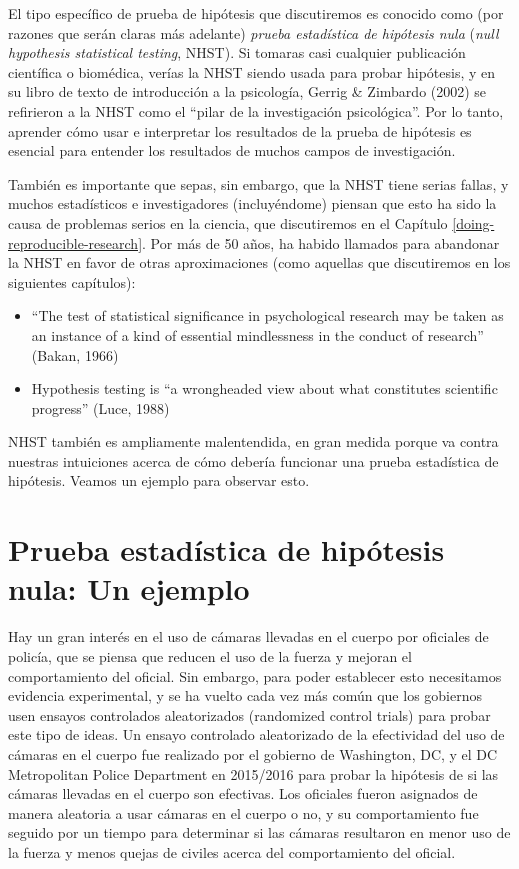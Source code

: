 \documentclass[
  12pt,
]{book}
\providecommand{\tightlist}{%
  \setlength{\itemsep}{0pt}\setlength{\parskip}{0pt}}
\begin{document}
El tipo específico de prueba de hipótesis que discutiremos es conocido como (por razones que serán claras más adelante) \emph{prueba estadística de hipótesis nula} (\emph{null hypothesis statistical testing}, NHST). Si tomaras casi cualquier publicación científica o biomédica, verías la NHST siendo usada para probar hipótesis, y en su libro de texto de introducción a la psicología, Gerrig \& Zimbardo (2002) se refirieron a la NHST como el ``pilar de la investigación psicológica''. Por lo tanto, aprender cómo usar e interpretar los resultados de la prueba de hipótesis es esencial para entender los resultados de muchos campos de investigación.

También es importante que sepas, sin embargo, que la NHST tiene serias fallas, y muchos estadísticos e investigadores (incluyéndome) piensan que esto ha sido la causa de problemas serios en la ciencia, que discutiremos en el Capítulo \ref{doing-reproducible-research}. Por más de 50 años, ha habido llamados para abandonar la NHST en favor de otras aproximaciones (como aquellas que discutiremos en los siguientes capítulos):

\begin{itemize}
\tightlist
\item
  ``The test of statistical significance in psychological research may be taken as an instance of a kind of essential mindlessness in the conduct of research'' (Bakan, 1966)
\item
  Hypothesis testing is ``a wrongheaded view about what constitutes scientific progress'' (Luce, 1988)
\end{itemize}

NHST también es ampliamente malentendida, en gran medida porque va contra nuestras intuiciones acerca de cómo debería funcionar una prueba estadística de hipótesis. Veamos un ejemplo para observar esto.

\hypertarget{prueba-estaduxedstica-de-hipuxf3tesis-nula-un-ejemplo}{%
\section{Prueba estadística de hipótesis nula: Un ejemplo}\label{prueba-estaduxedstica-de-hipuxf3tesis-nula-un-ejemplo}}

Hay un gran interés en el uso de cámaras llevadas en el cuerpo por oficiales de policía, que se piensa que reducen el uso de la fuerza y mejoran el comportamiento del oficial. Sin embargo, para poder establecer esto necesitamos evidencia experimental, y se ha vuelto cada vez más común que los gobiernos usen ensayos controlados aleatorizados (randomized control trials) para probar este tipo de ideas. Un ensayo controlado aleatorizado de la efectividad del uso de cámaras en el cuerpo fue realizado por el gobierno de Washington, DC, y el DC Metropolitan Police Department en 2015/2016 para probar la hipótesis de si las cámaras llevadas en el cuerpo son efectivas. Los oficiales fueron asignados de manera aleatoria a usar cámaras en el cuerpo o no, y su comportamiento fue seguido por un tiempo para determinar si las cámaras resultaron en menor uso de la fuerza y menos quejas de civiles acerca del comportamiento del oficial.
\end{document}
